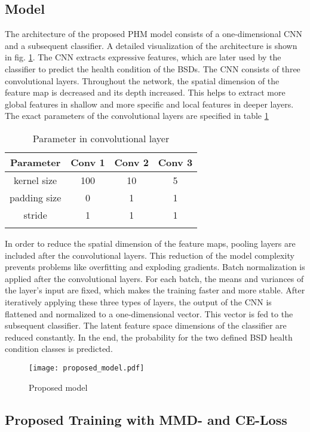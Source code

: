 \subsection{Model}
\label{sec:model}
The architecture of the proposed PHM model consists of a one-dimensional CNN and a subsequent classifier. A detailed visualization of the architecture is shown in fig. \ref{fig:proposed_model}. The CNN extracts expressive features, which are later used by the classifier to predict the health condition of the BSDs. The CNN consists of three convolutional layers. Throughout the network, the spatial dimension of the feature map is decreased and its depth increased. This helps to extract more global features in shallow and more specific and local features in deeper layers. The exact parameters of the convolutional layers are specified in table \ref{tab:parameter_conv} 
\begin{longtable}{c c c c} 
\toprule
Parameter & Conv 1 & Conv 2 & Conv 3 \\
\midrule
kernel size & 100 & 10 & 5 \\

padding size & 0 & 1 & 1 \\

stride & 1 & 1 & 1 \\
\bottomrule
\caption {Parameter in convolutional layer}
\label {tab:parameter_conv}
\end{longtable}

In order to reduce the spatial dimension of the feature maps, pooling layers are included after the convolutional layers. This reduction of the model complexity prevents problems like overfitting and exploding gradients. Batch normalization is applied after the convolutional layers. For each batch, the means and variances of the layer's input are fixed, which makes the training faster and more stable. After iteratively applying these three types of layers, the output of the CNN is flattened and normalized to a one-dimensional vector. This vector is fed to the subsequent classifier. The latent feature space dimensions of the classifier are reduced constantly. In the end, the probability for the two defined BSD health condition classes is predicted.


\begin{figure}[H]
  \centering
  \texttt{[image: proposed\_model.pdf]}
  \caption {Proposed model} \label{fig:proposed_model}
\end{figure}


\subsection{Proposed Training with MMD- and CE-Loss} \label{sec:Proposed_training}

